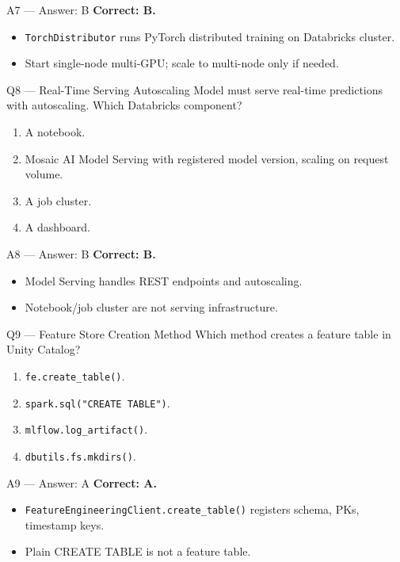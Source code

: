 \documentclass[aspectratio=169,9pt]{beamer}
\begin{document}
	\begin{frame}{A7 — Answer: B}
		\textbf{Correct: B.}
		\begin{itemize}
			\item \texttt{TorchDistributor} runs PyTorch distributed training on Databricks cluster.
			\item Start single-node multi-GPU; scale to multi-node only if needed.
		\end{itemize}
	\end{frame}
	
	\begin{frame}{Q8 — Real-Time Serving Autoscaling}
		Model must serve real-time predictions with autoscaling. Which Databricks component?
		\begin{enumerate}[label=\Alph*.]
			\item A notebook.
			\item Mosaic AI Model Serving with registered model version, scaling on request volume.
			\item A job cluster.
			\item A dashboard.
		\end{enumerate}
	\end{frame}
	
	\begin{frame}{A8 — Answer: B}
		\textbf{Correct: B.}
		\begin{itemize}
			\item Model Serving handles REST endpoints and autoscaling.
			\item Notebook/job cluster are not serving infrastructure.
		\end{itemize}
	\end{frame}
	
	\begin{frame}{Q9 — Feature Store Creation Method}
		Which method creates a feature table in Unity Catalog?
		\begin{enumerate}[label=\Alph*.]
			\item \texttt{fe.create\_table()}.
			\item \texttt{spark.sql("CREATE TABLE")}.
			\item \texttt{mlflow.log\_artifact()}.
			\item \texttt{dbutils.fs.mkdirs()}.
		\end{enumerate}
	\end{frame}
	
	\begin{frame}{A9 — Answer: A}
		\textbf{Correct: A.}
		\begin{itemize}
			\item \texttt{FeatureEngineeringClient.create\_table()} registers schema, PKs, timestamp keys.
			\item Plain CREATE TABLE is not a feature table.
		\end{itemize}
	\end{frame}
	
\end{document}
